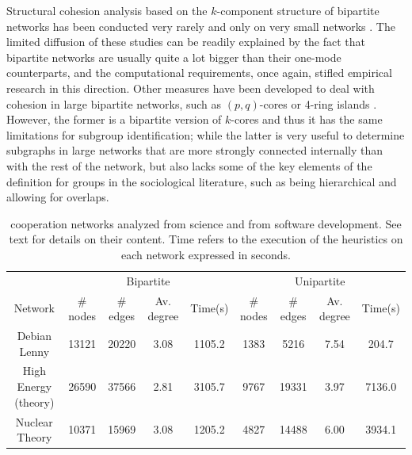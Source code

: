 Structural cohesion analysis based on the $k$-component structure of bipartite networks has been conducted very rarely and only on very small networks \citep{white:2004}. The limited diffusion of these studies can be readily explained by the fact that bipartite networks are usually quite a lot bigger than their one-mode counterparts, and the computational requirements, once again, stifled empirical research in this direction. Other measures have been developed to deal with cohesion in large bipartite networks, such as $(p, q)$-cores or 4-ring islands \citep{ahmed:2007}. However, the former is a bipartite version of $k$-cores and thus it has the same limitations for subgroup identification; while the latter is very useful to determine subgraphs in large networks that are more strongly connected internally than with the rest of the network, but also lacks some of the key elements of the definition for groups in the sociological literature, such as being hierarchical and allowing for overlaps.

\begin{table}[h]
\begin{center}
\begin{small}
\begin{tabular}{|c|c|c|c|c|c|c|c|c|}
\hline
&\multicolumn{4}{|c|}{Bipartite}&\multicolumn{4}{|c|}{Unipartite}\\
Network&\# nodes&\# edges&Av. degree&Time(s)&\# nodes&\# edges&Av. degree&Time(s)\\
\hline
Debian Lenny&13121&20220&3.08&1105.2&1383&5216&7.54&204.7\\
High Energy (theory)&26590&37566&2.81&3105.7&9767&19331&3.97&7136.0\\
Nuclear Theory&10371&15969&3.08&1205.2&4827&14488&6.00&3934.1\\
\hline
\end{tabular}
\end{small}
\caption[Example cooperation networks description.]{cooperation networks analyzed from science and from software development. See text for details on their content. Time refers to the execution of the heuristics on each network expressed in seconds.}
\label{desc}
\end{center}
\end{table}

